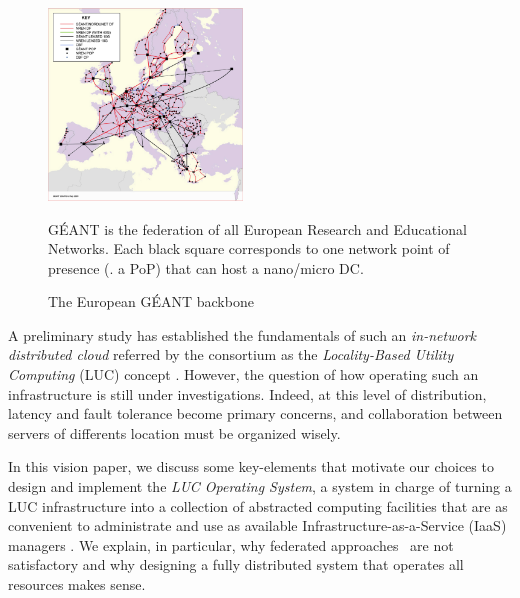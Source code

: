 \begin{figure}[hbp]
\centering
\includegraphics[width=0.46\textwidth]{./figures/geant.png}
\label{fig:geant}
\vspace*{-.35cm}
\caption{The European G\'EANT backbone}
{\small
 G\'EANT is the federation of all European Research and Educational
 Networks.
Each black square corresponds to one network point of presence (\aka.
a PoP) that can host a nano/micro DC.}
\vspace*{-.5cm}
\end{figure}

A preliminary study has established the fundamentals of such an
\emph{in-network distributed cloud} referred by the consortium  as the
\emph{Locality-Based Utility Computing} (LUC) concept
\cite{lebre:beyond2013}. However, the question of how operating such
an infrastructure is still under investigations. Indeed, at this level of
distribution, latency and fault tolerance become primary concerns, and
collaboration between servers of differents location must be organized
wisely.

In this vision paper, we discuss some key-elements that
motivate our choices to design and implement the
\emph{LUC Operating System}, a system in charge of turning
a LUC infrastructure into a collection of abstracted computing
facilities that are as convenient to administrate and use as available
Infrastructure-as-a-Service (IaaS) managers
\cite{cloudstack,opennebula,openstack}.
We explain, in particular, why federated approaches~\cite{buyya:intercloud} are not satisfactory  and
why designing a fully distributed system that operates all resources makes
sense.


%
%
%




